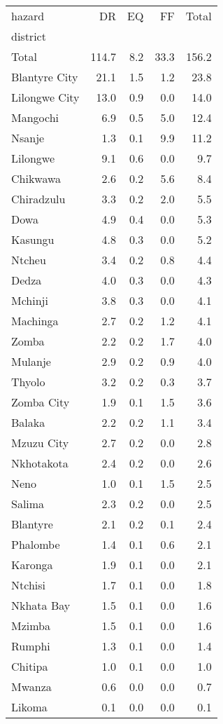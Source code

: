 \begin{tabular}{lrrrr}
\toprule
hazard &     DR &   EQ &    FF &  Total \\
district      &        &      &       &        \\
\midrule
Total         &  114.7 &  8.2 &  33.3 &  156.2 \\
Blantyre City &   21.1 &  1.5 &   1.2 &   23.8 \\
Lilongwe City &   13.0 &  0.9 &   0.0 &   14.0 \\
Mangochi      &    6.9 &  0.5 &   5.0 &   12.4 \\
Nsanje        &    1.3 &  0.1 &   9.9 &   11.2 \\
Lilongwe      &    9.1 &  0.6 &   0.0 &    9.7 \\
Chikwawa      &    2.6 &  0.2 &   5.6 &    8.4 \\
Chiradzulu    &    3.3 &  0.2 &   2.0 &    5.5 \\
Dowa          &    4.9 &  0.4 &   0.0 &    5.3 \\
Kasungu       &    4.8 &  0.3 &   0.0 &    5.2 \\
Ntcheu        &    3.4 &  0.2 &   0.8 &    4.4 \\
Dedza         &    4.0 &  0.3 &   0.0 &    4.3 \\
Mchinji       &    3.8 &  0.3 &   0.0 &    4.1 \\
Machinga      &    2.7 &  0.2 &   1.2 &    4.1 \\
Zomba         &    2.2 &  0.2 &   1.7 &    4.0 \\
Mulanje       &    2.9 &  0.2 &   0.9 &    4.0 \\
Thyolo        &    3.2 &  0.2 &   0.3 &    3.7 \\
Zomba City    &    1.9 &  0.1 &   1.5 &    3.6 \\
Balaka        &    2.2 &  0.2 &   1.1 &    3.4 \\
Mzuzu City    &    2.7 &  0.2 &   0.0 &    2.8 \\
Nkhotakota    &    2.4 &  0.2 &   0.0 &    2.6 \\
Neno          &    1.0 &  0.1 &   1.5 &    2.5 \\
Salima        &    2.3 &  0.2 &   0.0 &    2.5 \\
Blantyre      &    2.1 &  0.2 &   0.1 &    2.4 \\
Phalombe      &    1.4 &  0.1 &   0.6 &    2.1 \\
Karonga       &    1.9 &  0.1 &   0.0 &    2.1 \\
Ntchisi       &    1.7 &  0.1 &   0.0 &    1.8 \\
Nkhata Bay    &    1.5 &  0.1 &   0.0 &    1.6 \\
Mzimba        &    1.5 &  0.1 &   0.0 &    1.6 \\
Rumphi        &    1.3 &  0.1 &   0.0 &    1.4 \\
Chitipa       &    1.0 &  0.1 &   0.0 &    1.0 \\
Mwanza        &    0.6 &  0.0 &   0.0 &    0.7 \\
Likoma        &    0.1 &  0.0 &   0.0 &    0.1 \\
\bottomrule
\end{tabular}
